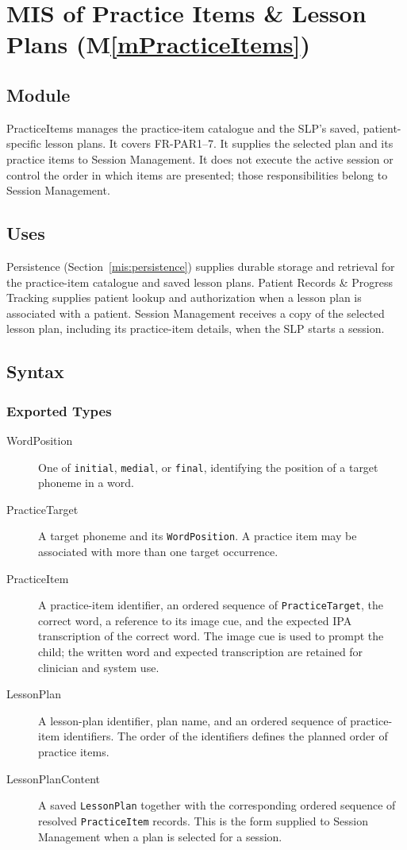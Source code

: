 \documentclass[12pt, titlepage]{article}
\newcommand{\mref}[1]{M\ref{#1}}
\begin{document}
\clearpage

\section{MIS of Practice Items \& Lesson Plans (\mref{mPracticeItems})} \label{mis:practice}

\subsection{Module}
PracticeItems manages the practice-item catalogue and the SLP's saved,
patient-specific lesson plans. It covers FR-PAR1--7. It supplies the
selected plan and its practice items to Session Management. It does not
execute the active session or control the order in which items are presented;
those responsibilities belong to Session Management.

\subsection{Uses}
Persistence (Section~\ref{mis:persistence}) supplies durable storage and
retrieval for the practice-item catalogue and saved lesson plans. Patient
Records \& Progress Tracking supplies patient lookup and authorization when a
lesson plan is associated with a patient. Session Management receives a copy
of the selected lesson plan, including its practice-item details, when the SLP
starts a session.

\subsection{Syntax}

\subsubsection{Exported Types}
\begin{description}
\item[WordPosition] One of \texttt{initial}, \texttt{medial}, or
\texttt{final}, identifying the position of a target phoneme in a word.
\item[PracticeTarget] A target phoneme and its \texttt{WordPosition}. A
practice item may be associated with more than one target occurrence.
\item[PracticeItem] A practice-item identifier, an ordered sequence of
\texttt{PracticeTarget}, the correct word, a reference to its image cue, and
the expected IPA transcription of the correct word. The image cue is used
to prompt the child; the written word and expected transcription are retained
for clinician and system use.
\item[LessonPlan] A lesson-plan identifier, plan name,
and an ordered sequence of practice-item identifiers. The order of the
identifiers defines the planned order of practice items.
\item[LessonPlanContent] A saved \texttt{LessonPlan} together with the
corresponding ordered sequence of resolved \texttt{PracticeItem} records.
This is the form supplied to Session Management when a plan is selected for
a session.
\end{description}
\end{document}
